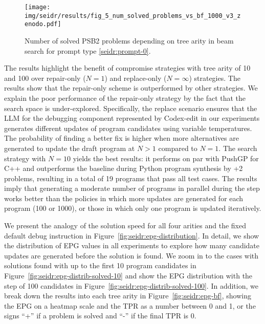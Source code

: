 \begin{figure}[t]
  \centering
  \texttt{[image: img/seidr/results/fig\_5\_num\_solved\_problems\_vs\_bf\_1000\_v3\_zenodo.pdf]}
  \caption{Number of solved PSB2 problems depending on tree arity in beam search for prompt type \ref{seidr:prompt-0}.}
  \label{fig:seidr:solved-vs-bf}
\end{figure}

The results highlight the benefit of compromise strategies with tree arity of 10 and 100 over repair-only ($N=1$) and replace-only ($N=\infty$) strategies. 
The results show that the repair-only scheme is outperformed by other strategies. 
We explain the poor performance of the repair-only strategy by the fact that the search space is under-explored. 
Specifically, the replace scenario ensures that the LLM for the debugging component represented by Codex-edit in our experiments generates different updates of program candidates using variable temperatures.
The probability of finding a better fix is higher when more alternatives are generated to update the draft program at $N>1$ compared to $N=1$. 
The search strategy with $N=10$ yields the best results: it performs on par with PushGP for C++ and outperforms the baseline during Python program synthesis by +2 problems, resulting in a total of 19 programs that pass all test cases.
The results imply that generating a moderate number of programs in parallel during the \debug{} step works better than the policies in which more updates are generated for each program (100 or 1000), 
or those in which only one program is updated iteratively.

We present the analogy of the solution speed for all four arities and the fixed default debug instruction in Figure~\ref{fig:seidr:epg-distribution}. 
In detail, we show the distribution of EPG values in all experiments to explore how many candidate updates are generated before the solution is found.
We zoom in to the cases with solutions found with up to the first 10 program candidates in Figure~\ref{fig:seidr:epg-distrib-solved-10} and show the EPG distribution with the step of 100 candidates in Figure~\ref{fig:seidr:epg-distrib-solved-100}. 
In addition, we break down the results into each tree arity in Figure~\ref{fig:seidr:epg-bf}, showing the EPG on a heatmap scale and the TPR as a number between 0 and 1, or the signs ``+'' if a problem is solved and ``-'' if the final TPR is 0. 


